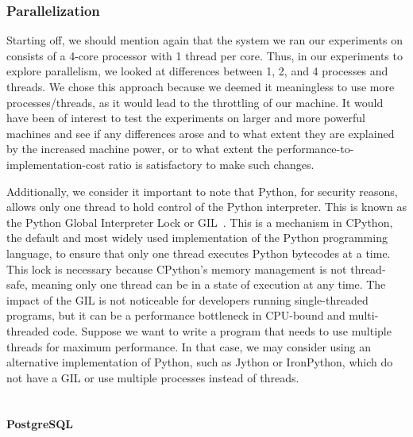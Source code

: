 \subsubsection{Parallelization}

Starting off, we should mention again that the system we ran our experiments on consists of a 4-core processor with 1 thread per core. 
Thus, in our experiments to explore parallelism, we looked at differences between 1, 2, and 4 processes and threads. 
We chose this approach because we deemed it meaningless to use more processes/threads, as it would lead to the throttling of our machine. 
It would have been of interest to test the experiments on larger and more powerful machines and see if any differences arose 
and to what extent they are explained by the increased machine power, or to what extent the performance-to-implementation-cost ratio is satisfactory 
to make such changes.

Additionally, we consider it important to note that Python, for security reasons, allows only one thread to hold control of the Python interpreter. 
This is known as the Python Global Interpreter Lock or GIL~\cite{PythonGIL}. This is a mechanism in CPython, the default and most widely used implementation of the 
Python programming language, to ensure that only one thread executes Python bytecodes at a time. 
This lock is necessary because CPython's memory management is not thread-safe, meaning only one thread can be in a state of execution at any time. 
The impact of the GIL is not noticeable for developers running single-threaded programs, 
but it can be a performance bottleneck in CPU-bound and multi-threaded code. Suppose we want to write a program that needs to use multiple threads 
for maximum performance. In that case, we may consider using an alternative implementation of Python, such as Jython or IronPython, 
which do not have a GIL or use multiple processes instead of threads.\\\\

\paragraph{PostgreSQL}

